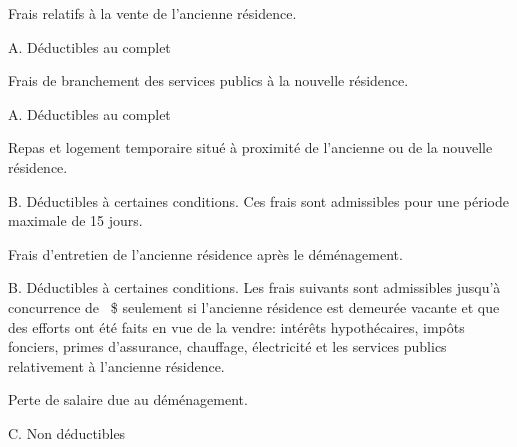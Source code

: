 \begin{sousQuestion}
	Frais relatifs à la vente de l'ancienne résidence.
\end{sousQuestion}
A.  Déductibles au complet

\begin{sousQuestion}
	Frais de branchement des services publics à la nouvelle résidence.
\end{sousQuestion}
A.  Déductibles au complet

\begin{sousQuestion}
	Repas et logement temporaire situé à proximité de l'ancienne ou de la nouvelle résidence.
\end{sousQuestion}
B.  Déductibles à certaines conditions. Ces frais sont admissibles pour une période maximale de 15 jours.

\begin{sousQuestion}
	Frais d'entretien de l'ancienne résidence après le déménagement.
\end{sousQuestion}
B.  Déductibles à certaines conditions. Les frais suivants sont admissibles jusqu'à concurrence de ~\$ seulement si l'ancienne résidence est demeurée vacante et que des efforts ont été faits en vue de la  vendre: intérêts hypothécaires, impôts fonciers, primes d'assurance, chauffage, électricité et les services publics relativement à l'ancienne résidence.

\begin{sousQuestion}
	Perte de salaire due au déménagement.
\end{sousQuestion}
C.  Non déductibles

